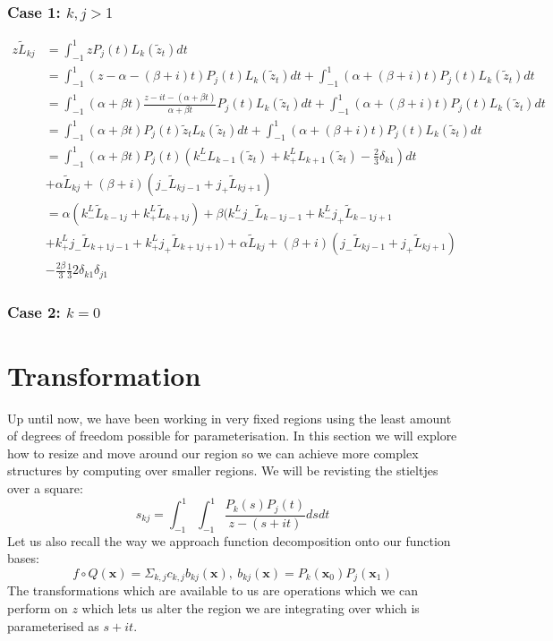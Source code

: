 \documentclass{article}
\begin{document}
\subsubsection{Case 1: $k,j>1$}
\begin{align}
    z\tilde{L}_{kj} &= \int_{-1}^1zP_j(t)L_k(\tilde{z}_t)dt\\
    &= \int_{-1}^1(z-\alpha-(\beta+i)t)P_j(t)L_k(\tilde{z}_t)dt
    +\int_{-1}^1(\alpha+(\beta+i)t)P_j(t)L_k(\tilde{z}_t)dt\\
    &= \int_{-1}^1(\alpha+\beta t)\frac{z-it-(\alpha+\beta t)}{\alpha+\beta t}P_j(t)L_k(\tilde{z}_t)dt
    +\int_{-1}^1(\alpha+(\beta+i)t)P_j(t)L_k(\tilde{z}_t)dt\\
    &= \int_{-1}^1(\alpha+\beta t)P_j(t)\tilde{z}_tL_k(\tilde{z}_t)dt
    +\int_{-1}^1(\alpha+(\beta+i)t)P_j(t)L_k(\tilde{z}_t)dt\\
    &= \int_{-1}^1(\alpha+\beta t)P_j(t)(k_-^LL_{k-1}(\tilde{z}_t)+k_+^LL_{k+1}(\tilde{z}_t)-\frac{2}{3}\delta_{k1})dt\\
    &+\alpha \tilde{L}_{kj}+(\beta+i)(j_-\tilde{L}_{kj-1}+j_+\tilde{L}_{kj+1})\\
    &=\alpha(k_-^L\tilde{L}_{k-1j}+k_+^L\tilde{L}_{k+1j})+
    \beta(k_-^Lj_-\tilde{L}_{k-1j-1}+k_-^Lj_+\tilde{L}_{k-1j+1}\\
    &+k_+^Lj_-\tilde{L}_{k+1j-1}+k_+^Lj_+\tilde{L}_{k+1j+1})+\alpha \tilde{L}_{kj}+(\beta+i)(j_-\tilde{L}_{kj-1}+j_+\tilde{L}_{kj+1})\\
    &-\frac{2\beta}{3}\frac{1}{3}2\delta_{k1}\delta_{j1}
\end{align}

\subsubsection{Case 2: $k=0$}

\section{Transformation}
Up until now, we have been working in very fixed regions using the least amount of degrees of freedom possible for parameterisation.
In this section we will explore how to resize and move around our region so we can achieve more complex structures by computing over smaller regions.
We will be revisting the stieltjes over a square:
$$s_{kj} = \int_{-1}^1\int_{-1}^1\frac{P_k(s)P_j(t)}{z-(s+it)}dsdt$$
Let us also recall the way we approach function decomposition onto our function bases:
$$f\circ Q(\textbf{x})=\Sigma_{k,j}c_{k,j}b_{kj}(\textbf{x}),\:b_{kj}(\textbf{x})=P_k(\textbf{x}_0)P_j(\textbf{x}_1)$$
The transformations which are available to us are operations which we can perform on $z$ which lets us alter the region we are integrating over which is parameterised as $s+it$.
\end{document}
